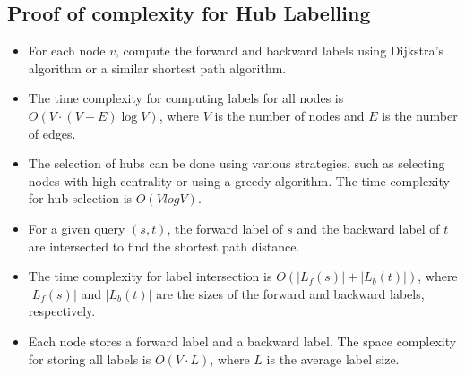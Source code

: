 \begin{appendices}
\section{Proof of complexity for Hub Labelling}\label{appendix:Hub Labelling:Complexity}
	\begin{itemize}
		\item For each node $v$, compute the forward and backward labels using Dijkstra's algorithm or a similar shortest path algorithm.
		\item The time complexity for computing labels for all nodes is $O(V \cdot (V+E)\log V)$, where $V$ is the number of nodes and $E$ is the number of edges.
		\item The selection of hubs can be done using various strategies, such as selecting nodes with high centrality or using a greedy algorithm. The time complexity for hub selection is $O(VlogV)$.
		\item For a given query $(s,t)$, the forward label of $s$ and the backward label of $t$ are intersected to find the shortest path distance.
		\item The time complexity for label intersection is $O(|L_f(s)| + |L_b(t)|)$, where $|L_f(s)|$ and $|L_b(t)|$ are the sizes of the forward and backward labels, respectively.
		\item Each node stores a forward label and a backward label. The space complexity for storing all labels is $O(V \cdot L)$, where $L$ is the average label size.
	\end{itemize}
	
	
\end{appendices}